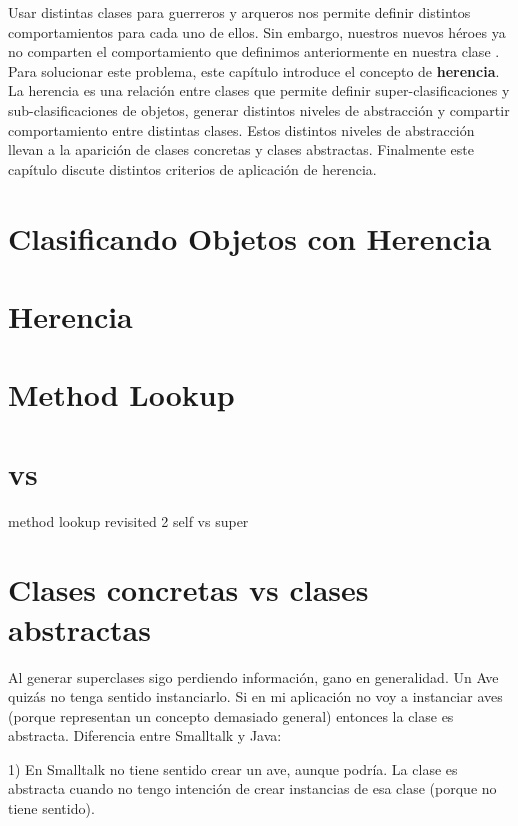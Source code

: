 \documentclass[a4paper,12pt]{book}
\begin{document}
Usar distintas clases para guerreros y arqueros nos permite definir distintos comportamientos para cada uno de ellos. Sin embargo, nuestros nuevos héroes ya no comparten el comportamiento que definimos anteriormente en nuestra clase . Para solucionar este problema, este capítulo introduce el concepto de \textbf{herencia}. La herencia es una relación entre clases que permite definir super-clasificaciones y sub-clasificaciones de objetos, generar distintos niveles de abstracción y compartir comportamiento entre distintas clases. Estos distintos niveles de abstracción llevan a la aparición de clases concretas y clases abstractas. Finalmente este capítulo discute distintos criterios de aplicación de herencia.

\section{Clasificando Objetos con Herencia}


\section{Herencia}

\section{Method Lookup}

\section{ vs }


method lookup revisited 2
self vs super

\section{Clases concretas vs clases abstractas}

Al generar superclases sigo perdiendo información, gano en generalidad. Un Ave quizás no
tenga sentido instanciarlo. Si en mi aplicación no voy a instanciar aves (porque representan un
concepto demasiado general) entonces la clase es abstracta.
Diferencia entre Smalltalk y Java:

1) En Smalltalk no tiene sentido crear un ave, aunque podría. La clase es abstracta
cuando no tengo intención de crear instancias de esa clase (porque no tiene sentido).
\end{document}
